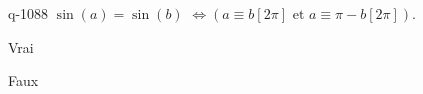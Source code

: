 \begin{truefalse}{q-1088}
$\sin(a)=\sin(b)$  $\Leftrightarrow \left(a\equiv b [2\pi]\text{ et } a\equiv \pi-b [2\pi]\right)$.
\item Vrai
\item* Faux
\end{truefalse}

